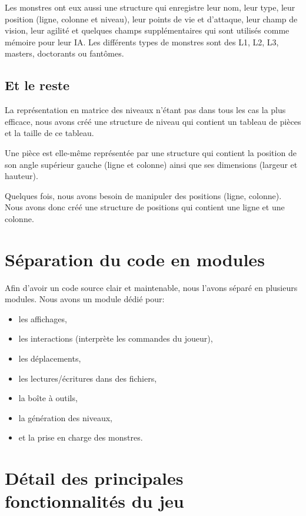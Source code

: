 \documentclass[11pt]{report}
\begin{document}
		Les monstres ont eux aussi une structure qui enregistre leur nom, leur type, leur position (ligne, colonne et niveau), leur points de vie et d'attaque, leur champ de vision, leur agilité et quelques champs supplémentaires qui sont utilisés comme mémoire pour leur IA. Les différents types de monstres sont des L1, L2, L3, masters, doctorants ou fantômes.
		
		\subsection{Et le reste}
		
		La représentation en matrice des niveaux n'étant pas dans tous les cas la plus efficace, nous avons créé une structure de niveau qui contient un tableau de pièces et la taille de ce tableau.
		
		Une pièce est elle-même représentée par une structure qui contient la position de son angle supérieur gauche (ligne et colonne) ainsi que ses dimensions (largeur et hauteur).
		
		Quelques fois, nous avons besoin de manipuler des positions (ligne, colonne). Nous avons donc créé une structure de positions qui contient une ligne et une colonne. 
		
	\section{Séparation du code en modules}
	
	Afin d'avoir un code source clair et maintenable, nous l'avons séparé en plusieurs modules. Nous avons un module dédié pour:
	\begin{itemize}
		\item les affichages,
		\item les interactions (interprète les commandes du joueur),
		\item les déplacements, 
		\item les lectures/écritures dans des fichiers,
		\item la boîte à outils,
		\item la génération des niveaux,
		\item et la prise en charge des monstres.
	\end{itemize}
	
	
	\section{Détail des principales fonctionnalités du jeu}
\end{document}
